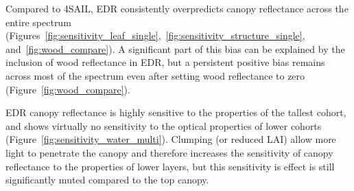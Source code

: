 Compared to 4SAIL, EDR consistently overpredicts canopy reflectance across the entire spectrum (Figures~\ref{fig:sensitivity_leaf_single},~\ref{fig:sensitivity_structure_single}, and~\ref{fig:wood_compare}).
A significant part of this bias can be explained by the inclusion of wood reflectance in EDR, but a persistent positive bias remains across most of the spectrum even after setting wood reflectance to zero (Figure~\ref{fig:wood_compare}).


EDR canopy reflectance is highly sensitive to the properties of the tallest cohort, and shows virtually no sensitivity to the optical properties of lower cohorts (Figure~\ref{fig:sensitivity_water_multi}).
Clumping (or reduced LAI) allow more light to penetrate the canopy and therefore increases the sensitivity of canopy reflectance to the properties of lower layers, but this sensitivity is effect is still significantly muted compared to the top canopy.
